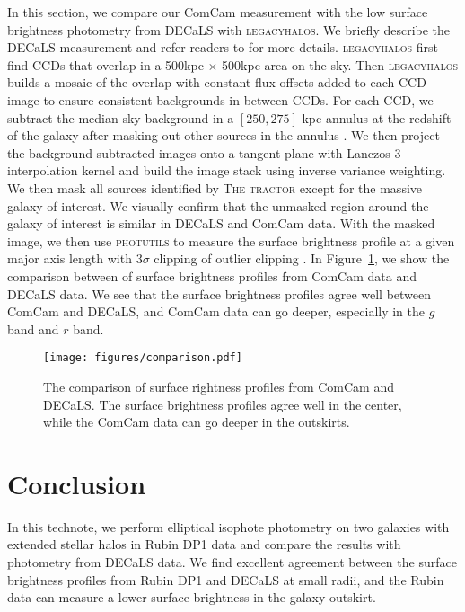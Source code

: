 \documentclass[SE,lsstdraft,authoryear,toc]{lsstdoc}
\newcommand{\lhalos}{\textsc{legacyhalos} }
\begin{document}
In this section, we compare our ComCam measurement with the low surface brightness photometry from DECaLS with \textsc{legacyhalos}. We briefly describe the DECaLS measurement and refer readers to \citep{liReachingEdgeProbing2022,moustakasSienaGalaxyAtlas2023} for more details.  \lhalos first find CCDs that overlap in a 500kpc $\times$ 500kpc area on the sky. Then \lhalos builds a mosaic of the overlap with constant flux offsets added to each CCD image to ensure consistent backgrounds in between CCDs. For each CCD, we subtract the median sky background in a $[250, 275]$ kpc annulus at the redshift of the galaxy after masking out other sources in the annulus \citep{liReachingEdgeProbing2022}. We then project the background-subtracted images onto a tangent plane with Lanczos-3 interpolation kernel and build the image stack using inverse variance weighting. We then mask all sources identified by \textsc{The tractor} \citep{langTractorProbabilisticAstronomical2016} except for the massive galaxy of interest. We visually confirm that the unmasked region around the galaxy of interest is similar in DECaLS and ComCam data. With the masked image, we then use \textsc{photutils} to measure the surface brightness profile at a given major axis length with $3\sigma$ clipping of outlier clipping \citep{huangIndividualStellarHaloes2018, liReachingEdgeProbing2022}. In Figure~\ref{fig:comparison}, we show the comparison between of surface brightness profiles from ComCam data and DECaLS data. We see that the surface brightness profiles agree well between ComCam and DECaLS, and ComCam data can go deeper, especially in the $g$ band and $r$ band.


\begin{figure}[!htbp]
  \centering
  \texttt{[image: figures/comparison.pdf]}
  \caption{The comparison of surface rightness profiles from ComCam and DECaLS. The surface brightness profiles agree well in the center, while the ComCam data can go deeper in the outskirts.}
  \label{fig:comparison}
\end{figure}

\section{Conclusion}
In this technote, we perform elliptical isophote photometry on two galaxies with extended stellar halos in Rubin DP1 data and compare the results with photometry from DECaLS data. We find excellent agreement between the surface brightness profiles from Rubin DP1 and DECaLS at small radii, and the Rubin data can measure a lower surface brightness in the galaxy outskirt.
\end{document}
